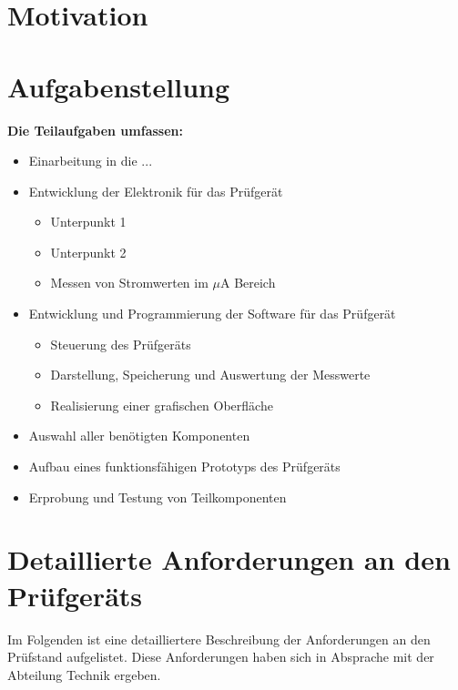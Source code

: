 \section{Motivation}
\clearpage

\section{Aufgabenstellung}

\textbf{Die Teilaufgaben umfassen:}

\begin{itemize}
	\item Einarbeitung in die ...
	\item Entwicklung der Elektronik für das Prüfgerät
	\begin{itemize}
		\item Unterpunkt 1
		\item Unterpunkt 2
		\item Messen von Stromwerten im \(\mu\)A Bereich
	\end{itemize}
	\item Entwicklung und Programmierung der Software für das Prüfgerät
	\begin{itemize}
		\item Steuerung des Prüfgeräts
		\item Darstellung, Speicherung und Auswertung der Messwerte
		\item Realisierung einer grafischen Oberfläche
	\end{itemize}
	\item Auswahl aller benötigten Komponenten
	\item Aufbau eines funktionsfähigen Prototyps des Prüfgeräts
	\item Erprobung und Testung von Teilkomponenten
\end{itemize}
\clearpage

\section{Detaillierte Anforderungen an den Prüfgeräts}
Im Folgenden ist eine detailliertere Beschreibung der Anforderungen an den Prüfstand aufgelistet. Diese Anforderungen haben sich in Absprache mit der Abteilung Technik ergeben.